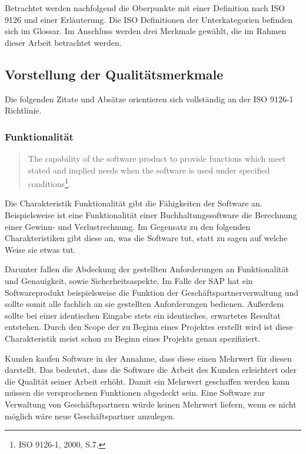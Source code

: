         Betrachtet werden nachfolgend die Oberpunkte mit einer Definition nach ISO 9126 und einer Erläuterung. Die ISO Definitionen der Unterkategorien befinden sich im Glossar. Im Anschluss werden drei Merkmale gewählt, die im Rahmen dieser Arbeit betrachtet werden.

    \subsection{Vorstellung der Qualitätsmerkmale}

        Die folgenden Zitate und Absätze orientieren sich vollständig an der ISO 9126-1 Richtlinie.

        \subsubsection{Funktionalität}

            \begin{quote}
              The capability of the software product to provide functions which meet stated and implied needs when the software is used under specified conditions\footnote{ISO 9126-1, 2000, S.7.}.
            \end{quote}

            Die Charakteristik Funktionalität gibt die Fähigkeiten der Software an. Beispielsweise ist eine Funktionalität einer Buchhaltungssoftware die Berechnung einer Gewinn- und Verlustrechnung. Im Gegensatz zu den folgenden Charakteristiken gibt diese an, was die Software tut, statt zu sagen auf welche Weise sie etwas tut.

            Darunter fallen die Abdeckung der gestellten Anforderungen an Funktionalität und Genauigkeit, sowie Sicherheitsaspekte. Im Falle der SAP hat ein Softwareprodukt beispielsweise die Funktion der Geschäftspartnerverwaltung und sollte somit alle fachlich an sie gestellten Anforderungen bedienen. Außerdem sollte bei einer identischen Eingabe stets ein identisches, erwartetes Resultat entstehen. Durch den Scope der zu Beginn eines Projektes erstellt wird ist diese Charakteristik meist schon zu Beginn eines Projekts genau spezifiziert.

            Kunden kaufen Software in der Annahme, dass diese einen Mehrwert für diesen darstellt. Das bedeutet, dass die Software die Arbeit des Kunden erleichtert oder die Qualität seiner Arbeit erhöht. Damit ein Mehrwert geschaffen werden kann müssen die versprochenen Funktionen abgedeckt sein. Eine Software zur Verwaltung von Geschäftspartnern würde keinen Mehrwert liefern, wenn es nicht möglich wäre neue Geschäftspartner anzulegen.


